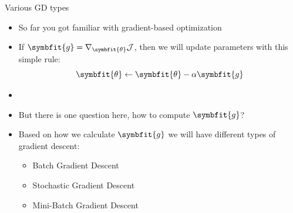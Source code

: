 
\begin{frame}{Various GD types}
    \begin{itemize}
    	\item So far you got familiar with gradient-based optimization
    	\item If $\symbfit{g} = \nabla_{\symbfit{\theta}} \mathcal{J}$, then we will update parameters with this simple rule:
    	\[
    	\symbfit{\theta} \gets \symbfit{\theta} - \alpha\symbfit{g}
    	\]
    	\item[]
    	\item But there is one question here, how to compute $\symbfit{g}$?
    	\item Based on how we calculate $\symbfit{g}$ we will have different types of gradient descent:
    	\begin{itemize}
    		\item Batch Gradient Descent
    		\item Stochastic Gradient Descent
    		\item Mini-Batch Gradient Descent
    	\end{itemize}
    \end{itemize}
\end{frame}

